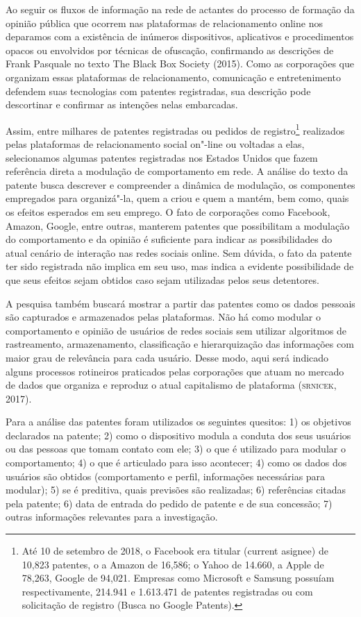 Ao seguir os fluxos de informação na rede de actantes do processo de
formação da opinião pública que ocorrem nas plataformas de
relacionamento online nos deparamos com a existência de inúmeros
dispositivos, aplicativos e procedimentos opacos ou envolvidos por
técnicas de ofuscação, confirmando as descrições de Frank Pasquale no
texto The Black Box Society (2015). Como as corporações que organizam
essas plataformas de relacionamento, comunicação e entretenimento
defendem suas tecnologias com patentes registradas, sua descrição pode
descortinar e confirmar as intenções nelas embarcadas.

Assim, entre milhares de patentes registradas ou pedidos de
registro\footnote{Até 10 de setembro de 2018, o Facebook era titular
  (current asignee) de 10,823 patentes, o a Amazon de 16,586; o Yahoo de
  14.660, a Apple de 78,263, Google de 94,021. Empresas como Microsoft e
  Samsung possuíam respectivamente, 214.941 e 1.613.471 de patentes
  registradas ou com solicitação de registro (Busca no Google Patents).}
realizados pelas plataformas de relacionamento social on"-line ou
voltadas a elas, selecionamos algumas patentes registradas nos Estados
Unidos que fazem referência direta a modulação de comportamento em rede.
A análise do texto da patente busca descrever e compreender a dinâmica
de modulação, os componentes empregados para organizá"-la, quem a criou e
quem a mantém, bem como, quais os efeitos esperados em seu emprego. O
fato de corporações como Facebook, Amazon, Google, entre outras,
manterem patentes que possibilitam a modulação do comportamento e da
opinião é suficiente para indicar as possibilidades do atual cenário de
interação nas redes sociais online. Sem dúvida, o fato da patente ter
sido registrada não implica em seu uso, mas indica a evidente
possibilidade de que seus efeitos sejam obtidos caso sejam utilizadas
pelos seus detentores.

A pesquisa também buscará mostrar a partir das patentes como os dados
pessoais são capturados e armazenados pelas plataformas. Não há como
modular o comportamento e opinião de usuários de redes sociais sem
utilizar algoritmos de rastreamento, armazenamento, classificação e
hierarquização das informações com maior grau de relevância para cada
usuário. Desse modo, aqui será indicado alguns processos rotineiros
praticados pelas corporações que atuam no mercado de dados que organiza
e reproduz o atual capitalismo de plataforma (\textsc{srnicek}, 2017).

Para a análise das patentes foram utilizados os seguintes quesitos: 1)
os objetivos declarados na patente; 2) como o dispositivo modula a
conduta dos seus usuários ou das pessoas que tomam contato com ele; 3) o
que é utilizado para modular o comportamento; 4) o que é articulado para
isso acontecer; 4) como os dados dos usuários são obtidos (comportamento
e perfil, informações necessárias para modular); 5) se é preditiva,
quais previsões são realizadas; 6) referências citadas pela patente; 6)
data de entrada do pedido de patente e de sua concessão; 7) outras
informações relevantes para a investigação.

